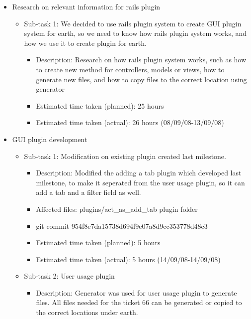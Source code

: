 \begin{itemize}
    \item Research on relevant information for rails plugin
        \begin{itemize}
            \item Sub-task 1: We decided to use rails plugin system to create GUI plugin system for earth, so we need to know how rails plugin system works, and how we use it to create plugin for earth.
                \begin{itemize}
                    \item Description: Research on how rails plugin system works, such as how to create new method for controllers, models or views, how to generate new files, and how to copy files to the correct location using generator
                    \item Estimated time taken (planned): 25 hours
                    \item Estimated time taken (actual):  26 hours (08/09/08-13/09/08)
                \end{itemize}
        \end{itemize}
    \item GUI plugin development
        \begin{itemize}
            \item Sub-task 1: Modification on existing plugin created last milestone.
                \begin{itemize}
                    \item Description: Modified the adding a tab plugin which developed last milestone, to make it seperated from the user usage plugin, so it can add a tab and a filter field as well.
                    \item Affected files: plugins/act\_as\_add\_tab plugin folder
                    \item git commit 954f8e7da15738d694f9e07a8d9cc353778d48c3
                    \item Estimated time taken (planned): 5 hours
                    \item Estimated time taken (actual): 5 hours (14/09/08-14/09/08)
                \end{itemize}
            \item Sub-task 2: User usage plugin
                \begin{itemize}
                    \item Description: Generator was used for user usage plugin to generate files. All files needed for the ticket 66 can be generated or copied to the correct locations under earth.

\end{itemize}
\end{itemize}
\end{itemize}

